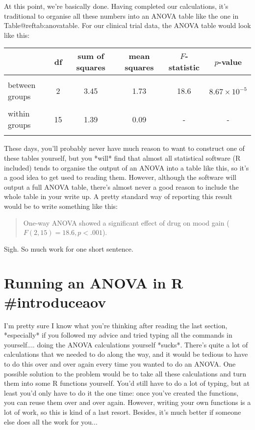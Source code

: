 At this point, we're basically done. Having completed our calculations, it's traditional to organise all these numbers into an ANOVA table like the one in Table@reftab:anovatable. For our clinical trial data, the ANOVA table would look like this:
\begin{center}
\begin{tabular}{l|ccccc} 
& df & sum of squares & mean squares & $F$-statistic & $p$-value \\  \hline \\ 
between groups & 2 & 3.45 & 1.73 & 18.6 & $8.67 \times 10^{-5}$ \\ \\
within groups   & 15 & 1.39 & 0.09 & - & - \\ \\ 
\end{tabular}
\end{center}

These days, you'll probably never have much reason to want to construct one of these tables yourself, but you *will* find that almost all statistical software (R included) tends to organise the output of an ANOVA into a table like this, so it's a good idea to get used to reading them. However, although the software will output a full ANOVA table, there's almost never a good reason to include the whole table in your write up. A pretty standard way of reporting this result would be to write something like this:
\begin{quote}
One-way ANOVA showed a significant effect of drug on mood gain ($F(2,15) = 18.6, p<.001$).
\end{quote}
Sigh. So much work for one short sentence.


\section{Running an ANOVA in R {#introduceaov}}

I'm pretty sure I know what you're thinking after reading the last section, *especially* if you followed my advice and tried typing all the commands in yourself.... doing the ANOVA calculations yourself *sucks*. There's quite a lot of calculations that we needed to do along the way, and it would be tedious to have to do this over and over again every time you wanted to do an ANOVA. One possible solution to the problem would be to take all these calculations and turn them into some R functions yourself. You'd still have to do a lot of typing, but at least you'd only have to do it the one time: once you've created the functions, you can reuse them over and over again. However, writing your own functions is a lot of work, so this is kind of a last resort. Besides, it's much better if someone else does all the work for you...


